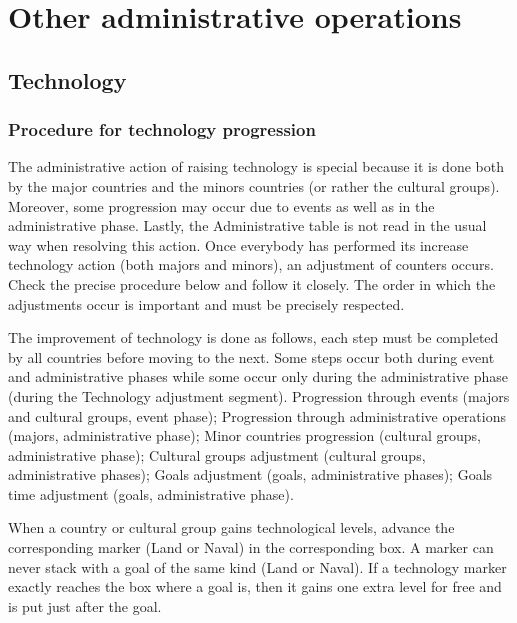 \section{Other administrative operations}\label{chAdministration:Techno and Competition}



\subsection{Technology}\label{chAdministration:Technology}


\subsubsection{Procedure for technology progression}
\aparag The administrative action of raising technology is special because it
is done both by the major countries and the minors countries (or rather the
cultural groups). Moreover, some progression may occur due to events as well
as in the administrative phase. Lastly, the Administrative table is not read
in the usual way when resolving this action.
\bparag Once everybody has performed its increase technology action (both
majors and minors), an adjustment of counters occurs. Check the precise
procedure below and follow it closely. The order in which the adjustments
occur is important and must be precisely respected.

 The improvement of technology is done
as follows, each step must be completed by all countries before moving to the
next. Some steps occur both during event and administrative phases while some
occur only during the administrative phase (during the Technology adjustment
segment).
\bparag Progression through events (majors and cultural groups, event phase);
\bparag Progression through administrative operations (majors, administrative
phase);
\bparag Minor countries progression (cultural groups, administrative phase);
\bparag Cultural groups adjustment (cultural groups, administrative phases);
\bparag Goals adjustment (goals, administrative phases);
\bparag Goals time adjustment (goals, administrative phase).

\aparag[Progression] When a country or cultural group gains technological
levels, advance the corresponding marker (Land or Naval) in the corresponding
box.
\bparag A marker can never stack with a goal of the same kind (Land or
Naval). If a technology marker exactly reaches the box where a goal is, then
it gains one extra level for free and is put just after the goal.

